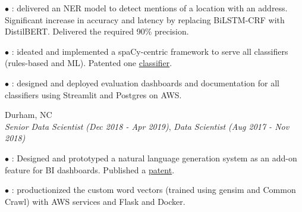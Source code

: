 \documentclass[resmargin]{resume_style_class} %
\newenvironment{outline}
  {\begin{list}{}{\setlength{\leftmargin}{30pt}\setlength\itemsep{-2pt}}}
  {\end{list}}
\newenvironment{outline-cond}
  {\begin{list}{}{
  \setlength{\leftmargin}{30pt}
  \setlength\topsep{-10pt}
  \setlength\itemindent{-30pt}
  }}
  {\end{list}}
\begin{document}
\begin{resume}
\begin{outline}
	\item[$\bullet$\hspace{0.1cm}] : delivered an NER model to detect mentions of a location with an address. Significant increase in accuracy and latency by replacing BiLSTM-CRF with DistilBERT. Delivered the required 90\% precision. 
	\item[$\bullet$\hspace{0.1cm}]  : ideated and implemented a spaCy-centric framework to serve all classifiers (rules-based and ML). Patented one \href{https://image-ppubs.uspto.gov/dirsearch-public/print/downloadPdf/11586739}{classifier}.
	\item[$\bullet$\hspace{0.1cm}]  : designed and deployed evaluation dashboards and documentation for all classifiers using Streamlit and Postgres on AWS.
\end{outline} 

\begin{large}  \end{large} \hfill Durham, NC
\vspace{5pt} \\
\textit{Senior Data Scientist (Dec 2018 - Apr 2019)}, \textit{Data Scientist (Aug 2017 - Nov 2018)}
\vspace{2pt}
\begin{outline}
	\item[$\bullet$\hspace{0.1cm}] : Designed and prototyped a natural language generation system as an add-on feature for BI dashboards. Published a  \href{https://image-ppubs.uspto.gov/dirsearch-public/print/downloadPdf/20220414324}{patent}.
	\item[$\bullet$\hspace{0.1cm}] : productionized the custom word vectors (trained using gensim and Common Crawl) with AWS services and Flask and Docker.
\end{outline} 




\end{resume}
\end{document}
